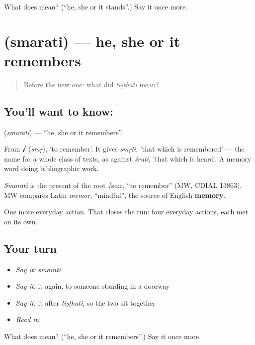 \begin{tcolorbox}[breakable,colback=teal!4,colframe=teal!35!black,title={Before you move on}]
What does  mean? (\textquotedblleft{}he, she or it stands\textquotedblright{}.) Say it once more.
\end{tcolorbox}
\section[\texorpdfstring{\sk{स्मरति} (smarati)}{स्मरति (smarati)}]{ (smarati) — he, she or it remembers}

\label{lesson:SA-C21-remember}



\begin{quote}
Before the new one: what did \emph{tiṣṭhati} mean?
\end{quote}

\subsection*{You'll want to know: }
\textbf{} (\emph{smarati}) — \textquotedblleft{}he, she or it remembers\textquotedblright{}.

From \textbf{√} (\emph{smṛ}), 'to remember'. It gives \emph{smṛti}, 'that which is remembered' — the name for a whole class of texts, as against \emph{śruti}, 'that which is heard'. A memory word doing bibliographic work.

\begin{cousinweb}
\emph{Smarati} is the present of the root √smṛ, \textquotedblleft{}to remember\textquotedblright{} (MW, CDIAL 13863). MW compares Latin \emph{memor}, \textquotedblleft{}mindful\textquotedblright{}, the source of English \textbf{memory}.
\end{cousinweb}

\begin{grammarlens}[title={What you've built}]
One more everyday action. That closes the run: four everyday actions, each met on its own.
\end{grammarlens}

\subsection*{Your turn}
\begin{itemize}
\raggedright
  \item \emph{Say it:} \emph{smarati}
  \item \emph{Say it:} it again, to someone standing in a doorway
  \item \emph{Say it:} it after \emph{tiṣṭhati}, so the two sit together
  \item \emph{Read it:} \textbf{}
\end{itemize}

\begin{tcolorbox}[breakable,colback=teal!4,colframe=teal!35!black,title={Before you move on}]
What does  mean? (\textquotedblleft{}he, she or it remembers\textquotedblright{}.) Say it once more.
\end{tcolorbox}
